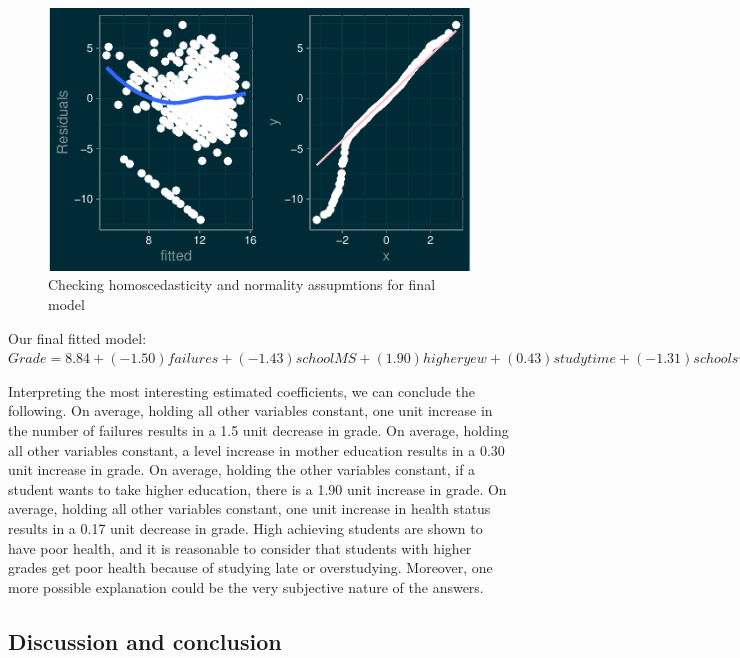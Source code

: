 \documentclass[letterpaper,9pt,twocolumn,twoside,]{pinp}
\begin{document}
\begin{figure}
\includegraphics{report_files/figure-latex/unnamed-chunk-8-1} \caption{Checking homoscedasticity and normality assupmtions for final model}\label{fig:unnamed-chunk-8}
\end{figure}

Our final fitted model:
\(Grade = 8.84 + (-1.50) failures + (-1.43) schoolMS + (1.90) higheryew + (0.43) studytime + (-1.31) schoolsupyes + (-0.39) Dalc + (-0.17) health + (-0.55) sexM + (-0.44) romenticyes + (0.16) age + (0.30) Medu + (-0.47) guardianMother + (-0.04) guardianOther\)
\linebreak

Interpreting the most interesting estimated coefficients, we can
conclude the following. On average, holding all other variables
constant, one unit increase in the number of failures results in a 1.5
unit decrease in grade. On average, holding all other variables
constant, a level increase in mother education results in a 0.30 unit
increase in grade. On average, holding the other variables constant, if
a student wants to take higher education, there is a 1.90 unit increase
in grade. On average, holding all other variables constant, one unit
increase in health status results in a 0.17 unit decrease in grade. High
achieving students are shown to have poor health, and it is reasonable
to consider that students with higher grades get poor health because of
studying late or overstudying. Moreover, one more possible explanation
could be the very subjective nature of the answers.\linebreak

\hypertarget{discussion-and-conclusion}{%
\subsection{Discussion and conclusion}\label{discussion-and-conclusion}}
\end{document}
